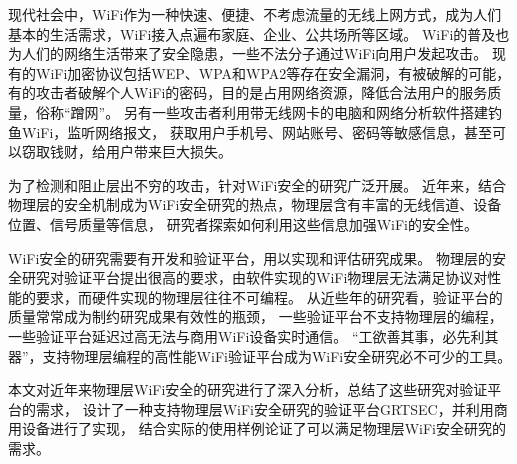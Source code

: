 
\begin{cabstract}

	现代社会中，WiFi作为一种快速、便捷、不考虑流量的无线上网方式，成为人们基本的生活需求，WiFi接入点遍布家庭、企业、公共场所等区域。
	WiFi的普及也为人们的网络生活带来了安全隐患，一些不法分子通过WiFi向用户发起攻击。
	现有的WiFi加密协议包括WEP、WPA和WPA2等存在安全漏洞，有被破解的可能，
	有的攻击者破解个人WiFi的密码，目的是占用网络资源，降低合法用户的服务质量，俗称“蹭网”。
	另有一些攻击者利用带无线网卡的电脑和网络分析软件搭建钓鱼WiFi，监听网络报文，
	获取用户手机号、网站账号、密码等敏感信息，甚至可以窃取钱财，给用户带来巨大损失。

	为了检测和阻止层出不穷的攻击，针对WiFi安全的研究广泛开展。
	近年来，结合物理层的安全机制成为WiFi安全研究的热点，物理层含有丰富的无线信道、设备位置、信号质量等信息，
	研究者探索如何利用这些信息加强WiFi的安全性。

	WiFi安全的研究需要有开发和验证平台，用以实现和评估研究成果。
	物理层的安全研究对验证平台提出很高的要求，由软件实现的WiFi物理层无法满足协议对性能的要求，而硬件实现的物理层往往不可编程。
	从近些年的研究看，验证平台的质量常常成为制约研究成果有效性的瓶颈，
	一些验证平台不支持物理层的编程，一些验证平台延迟过高无法与商用WiFi设备实时通信。
	“工欲善其事，必先利其器”，支持物理层编程的高性能WiFi验证平台成为WiFi安全研究必不可少的工具。

	本文对近年来物理层WiFi安全的研究进行了深入分析，总结了这些研究对验证平台的需求，
	设计了一种支持物理层WiFi安全研究的验证平台GRTSEC，并利用商用设备进行了实现，
	结合实际的使用样例论证了可以满足物理层WiFi安全研究的需求。

\end{cabstract}

